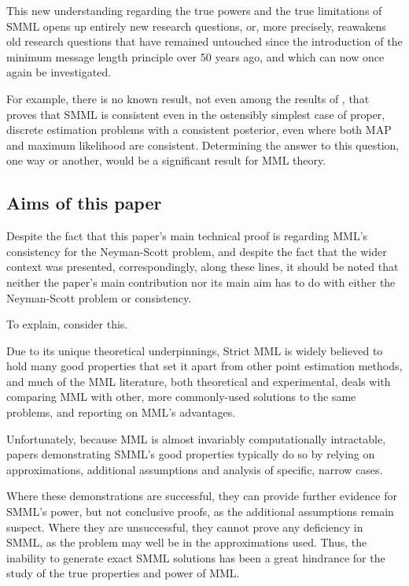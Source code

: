 \documentclass{IEEEtran}
\newcommand{\citet}[1]{\cite{#1}}
\begin{document}
This new understanding regarding the true powers and the true limitations of
SMML opens up entirely new research questions, or, more precisely, reawakens
old research questions that have remained untouched since the introduction of
the minimum message length principle over 50 years ago, and which can now
once again be investigated.

For example, there is no known result, not even among the results of
\citet{BarronCover1991}, that proves that SMML is consistent even in the
ostensibly simplest case of proper, discrete estimation problems with a
consistent posterior, even where both MAP and maximum likelihood are consistent.
Determining the answer to this question, one way or another, would be a
significant result for MML theory.

\subsection{Aims of this paper}

Despite the fact that this paper's main technical proof is regarding MML's
consistency for the Neyman-Scott problem, and despite the fact that the
wider context was presented, correspondingly, along these lines, it should
be noted that neither the paper's main contribution nor its main aim has
to do with either the Neyman-Scott problem or consistency.

To explain, consider this.

Due to its unique theoretical underpinnings, Strict MML
is widely believed to hold many good properties that set it apart from
other point estimation methods, and much of the MML literature, both
theoretical and experimental, deals with comparing MML with other, more
commonly-used solutions to the same problems, and reporting on MML's
advantages.

Unfortunately, because MML is almost invariably computationally intractable,
papers demonstrating SMML’s good properties typically do so by relying on
approximations, additional assumptions and analysis of specific, narrow cases.

Where these demonstrations are successful, they can provide further evidence
for SMML's power, but not conclusive proofs, as the additional assumptions
remain suspect. Where they are unsuccessful, they cannot prove any deficiency
in SMML, as the problem may well be in the approximations used.
Thus, the inability to generate exact SMML solutions has been a great
hindrance for the study of the true properties and power of MML.
\end{document}
